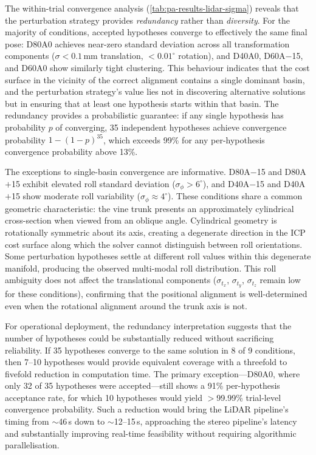 The within-trial convergence analysis (\cref{tab:pa-results-lidar-sigma}) reveals that the perturbation strategy provides \emph{redundancy} rather than \emph{diversity}. For the majority of conditions, accepted hypotheses converge to effectively the same final pose: D80A0 achieves near-zero standard deviation across all transformation components ($\sigma < 0.1$\,mm translation, $< 0.01^{\circ}$ rotation), and D40A0, D60A$-$15, and D60A0 show similarly tight clustering. This behaviour indicates that the cost surface in the vicinity of the correct alignment contains a single dominant basin, and the perturbation strategy's value lies not in discovering alternative solutions but in ensuring that at least one hypothesis starts within that basin. The redundancy provides a probabilistic guarantee: if any single hypothesis has probability $p$ of converging, 35 independent hypotheses achieve convergence probability $1 - (1-p)^{35}$, which exceeds 99\% for any per-hypothesis convergence probability above 13\%.

The exceptions to single-basin convergence are informative. D80A$-$15 and D80A$+$15 exhibit elevated roll standard deviation ($\sigma_\phi > 6^{\circ}$), and D40A$-$15 and D40A$+$15 show moderate roll variability ($\sigma_\phi \approx 4^{\circ}$). These conditions share a common geometric characteristic: the vine trunk presents an approximately cylindrical cross-section when viewed from an oblique angle. Cylindrical geometry is rotationally symmetric about its axis, creating a degenerate direction in the ICP cost surface along which the solver cannot distinguish between roll orientations. Some perturbation hypotheses settle at different roll values within this degenerate manifold, producing the observed multi-modal roll distribution. This roll ambiguity does not affect the translational components ($\sigma_{t_x}$, $\sigma_{t_y}$, $\sigma_{t_z}$ remain low for these conditions), confirming that the positional alignment is well-determined even when the rotational alignment around the trunk axis is not.

For operational deployment, the redundancy interpretation suggests that the number of hypotheses could be substantially reduced without sacrificing reliability. If 35 hypotheses converge to the same solution in 8 of 9 conditions, then 7--10 hypotheses would provide equivalent coverage with a threefold to fivefold reduction in computation time. The primary exception---D80A0, where only 32 of 35 hypotheses were accepted---still shows a 91\% per-hypothesis acceptance rate, for which 10 hypotheses would yield $>$99.99\% trial-level convergence probability. Such a reduction would bring the LiDAR pipeline's timing from $\sim$46\,s down to $\sim$12--15\,s, approaching the stereo pipeline's latency and substantially improving real-time feasibility without requiring algorithmic parallelisation.

